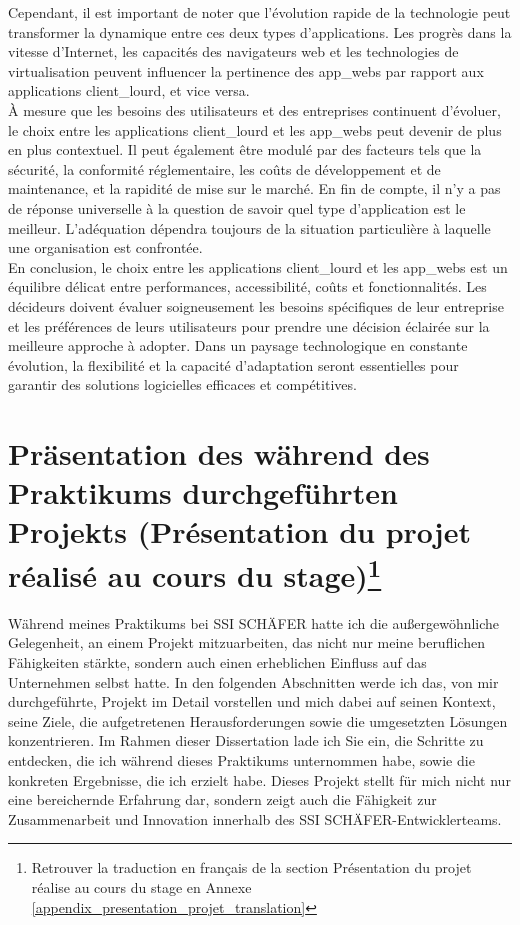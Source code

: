 \documentclass[a4paper, 12pt, french]{article}
\begin{document}
			Cependant, il est important de noter que l'évolution rapide de la technologie peut transformer la dynamique entre ces deux types d'applications. Les progrès dans la vitesse d'Internet, les capacités des navigateurs web et les technologies de virtualisation peuvent influencer la pertinence des \glspl{app_web} par rapport aux applications \gls{client_lourd}, et vice versa.\\

			À mesure que les besoins des utilisateurs et des entreprises continuent d'évoluer, le choix entre les applications \gls{client_lourd} et les \glspl{app_web} peut devenir de plus en plus contextuel. Il peut également être modulé par des facteurs tels que la sécurité, la conformité réglementaire, les coûts de développement et de maintenance, et la rapidité de mise sur le marché. En fin de compte, il n'y a pas de réponse universelle à la question de savoir quel type d'application est le meilleur. L'adéquation dépendra toujours de la situation particulière à laquelle une organisation est confrontée.\\

			En conclusion, le choix entre les applications \gls{client_lourd} et les \glspl{app_web} est un équilibre délicat entre performances, accessibilité, coûts et fonctionnalités. Les décideurs doivent évaluer soigneusement les besoins spécifiques de leur entreprise et les préférences de leurs utilisateurs pour prendre une décision éclairée sur la meilleure approche à adopter. Dans un paysage technologique en constante évolution, la flexibilité et la capacité d'adaptation seront essentielles pour garantir des solutions logicielles efficaces et compétitives.
			
	\newpage
	\part{Präsentation des während des Praktikums durchgeführten Projekts (Présentation du projet réalisé au cours du stage)\footnote{Retrouver la traduction en français de la section Présentation du projet réalise au cours du stage en Annexe \ref{appendix_presentation_projet_translation} }}
		Während meines Praktikums bei SSI SCHÄFER hatte ich die außergewöhnliche Gelegenheit, an einem Projekt mitzuarbeiten, das nicht nur meine beruflichen Fähigkeiten stärkte, sondern auch einen erheblichen Einfluss auf das Unternehmen selbst hatte. In den folgenden Abschnitten werde ich das, von mir durchgeführte, Projekt im Detail vorstellen und mich dabei auf seinen Kontext, seine Ziele, die aufgetretenen Herausforderungen sowie die umgesetzten Lösungen konzentrieren. Im Rahmen dieser Dissertation lade ich Sie ein, die Schritte zu entdecken, die ich während dieses Praktikums unternommen habe, sowie die konkreten Ergebnisse, die ich erzielt habe. Dieses Projekt stellt für mich nicht nur eine bereichernde Erfahrung dar, sondern zeigt auch die Fähigkeit zur Zusammenarbeit und Innovation innerhalb des SSI SCHÄFER-Entwicklerteams.
		
\end{document}
